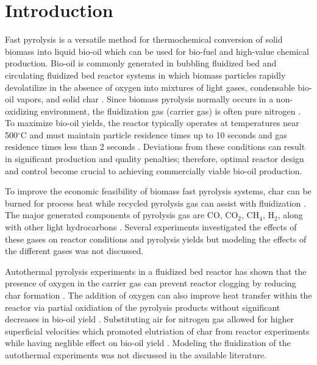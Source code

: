 
\section{Introduction}

Fast pyrolysis is a versatile method for thermochemical conversion of solid biomass into liquid bio-oil which can be used for bio-fuel and high-value chemical production. Bio-oil is commonly generated in bubbling fluidized bed and circulating fluidized bed reactor systems in which biomass particles rapidly devolatilize in the absence of oxygen into mixtures of light gases, condensable bio-oil vapors, and solid char \cite{Bridgwater-1999, Bridgwater-2018a, Mohan-2006}. Since biomass pyrolysis normally occurs in a non-oxidizing environment, the fluidization gas (carrier gas) is often pure nitrogen \cite{Mohan-2006}. To maximize bio-oil yields, the reactor typically operates at temperatures near 500$^\circ$C and must maintain particle residence times up to 10 seconds and gas residence times less than 2 seconds \cite{Bridgwater-2018a}. Deviations from these conditions can result in significant production and quality penalties; therefore, optimal reactor design and control become crucial to achieving commercially viable bio-oil production.

To improve the economic feasibility of biomass fast pyrolysis systems, char can be burned for process heat while recycled pyrolysis gas can assist with fluidization \cite{Bridgwater-1999, Mante-2012, Elkasabi-2015}. The major generated components of pyrolysis gas are CO, CO$_2$, CH$_4$, H$_2$, along with other light hydrocarbons \cite{Asadullah-2008, Zhang-2011}. Several experiments investigated the effects of these gases on reactor conditions and pyrolysis yields \cite{Mante-2012, Mullen-2013, Zhang-2011, Elkasabi-2015} but modeling the effects of the different gases was not discussed.

Autothermal pyrolysis experiments in a fluidized bed reactor has shown that the presence of oxygen in the carrier gas can prevent reactor clogging by reducing char formation \cite{Kim-2014}. The addition of oxygen can also improve heat transfer within the reactor via partial oxidiation of the pyrolysis products without significant decreases in bio-oil yield \cite{Polin-2019a}. Substituting air for nitrogen gas allowed for higher superficial velocities which promoted elutriation of char from reactor experiments while having neglible effect on bio-oil yield \cite{Polin-2019b}. Modeling the fluidization of the autothermal experiments was not discussed in the available literature.

